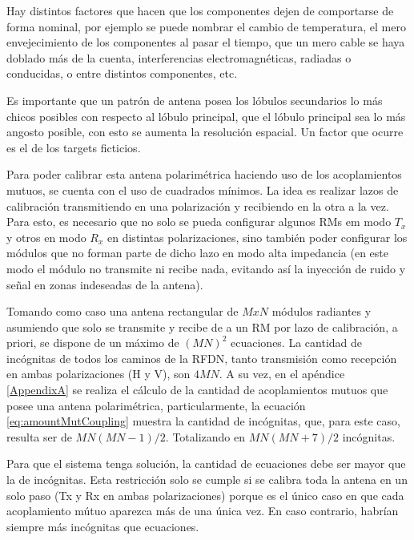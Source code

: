 Hay distintos factores que hacen que los componentes dejen de comportarse de forma nominal, por ejemplo se puede nombrar el
cambio de temperatura, el mero envejecimiento de los componentes al pasar el tiempo, que un mero cable se haya doblado más
de la cuenta, interferencias electromagnéticas, radiadas o conducidas, o entre distintos componentes, etc. 

Es importante que un patrón de antena posea los lóbulos secundarios lo más chicos posibles con respecto al lóbulo principal,
que el lóbulo principal sea lo más angosto posible, con esto se aumenta la resolución espacial. Un factor que ocurre es el 
de los targets ficticios.



Para poder calibrar esta antena polarimétrica haciendo uso de los acoplamientos mutuos, se cuenta con el uso de 
cuadrados mínimos. La idea es realizar lazos de calibración transmitiendo en una polarización y recibiendo en la
otra a la vez. Para esto, es necesario que no solo se pueda configurar algunos RMs em modo $T_x$ y otros en modo $R_x$ en 
distintas polarizaciones, sino también poder configurar los módulos que no forman parte de dicho lazo en modo alta 
impedancia (en este modo el módulo no transmite ni recibe nada, evitando así la inyección de ruido y señal en zonas 
indeseadas de la antena). 

Tomando como caso una antena rectangular de $M x N$ módulos radiantes y asumiendo que solo se transmite y recibe de a un 
RM por lazo de calibración, a priori, se dispone de un máximo de $(MN)^2$ ecuaciones. La cantidad de incógnitas de todos
los caminos de la RFDN, tanto transmisión como recepción en ambas polarizaciones (H y V), son $4MN$. A su vez, en el 
apéndice \ref{AppendixA} se realiza el cálculo de la cantidad de acoplamientos mutuos que posee una antena polarimétrica,
particularmente, la ecuación \ref{eq:amountMutCoupling} muestra la cantidad de incógnitas, que, para este caso, resulta 
ser de $MN(MN-1)/2$. Totalizando en $MN(MN + 7)/2$ incógnitas.

Para que el sistema tenga solución, la cantidad de ecuaciones debe ser mayor que la de incógnitas. Esta restricción solo 
se cumple si se calibra toda la antena en un solo paso (Tx y Rx en ambas polarizaciones) porque es el único caso en que 
cada acoplamiento mútuo aparezca más de una única vez. En caso contrario, habrían siempre más incógnitas que ecuaciones.

